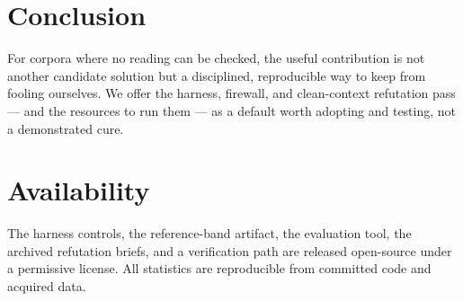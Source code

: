 \documentclass[11pt]{article}
\begin{document}
\section{Conclusion}
For corpora where no reading can be checked, the useful contribution is not another candidate
solution but a disciplined, reproducible way to keep from fooling ourselves. We offer the harness,
firewall, and clean-context refutation pass --- and the resources to run them --- as a default
worth adopting and testing, not a demonstrated cure.

\section*{Availability}
The harness controls, the reference-band artifact, the evaluation tool, the archived refutation
briefs, and a verification path are released open-source under a permissive license. All
statistics are reproducible from committed code and acquired data.



\end{document}
